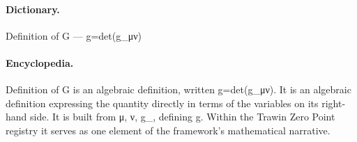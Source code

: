 \paragraph{Dictionary.}
Definition of G — g=det(g\_μν)

\paragraph{Encyclopedia.}
Definition of G is an algebraic definition, written g=det(g\_μν). It is an algebraic definition expressing the quantity directly in terms of the variables on its right-hand side. It is built from μ, ν, g\_, defining g. Within the Trawin Zero Point registry it serves as one element of the framework's mathematical narrative.
